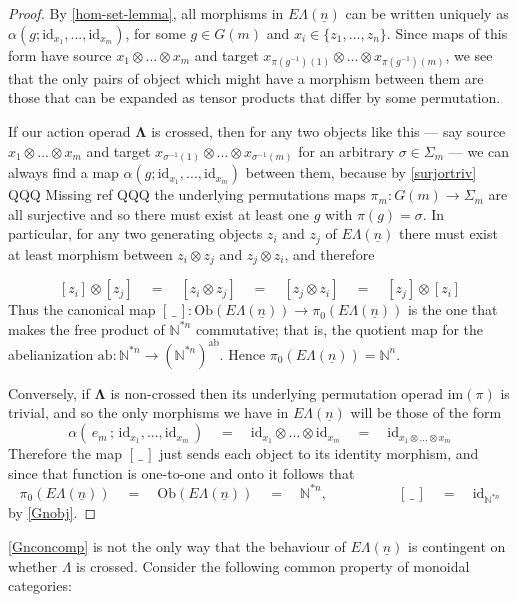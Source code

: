 \documentclass{amsbook} %
\newcommand{\ML}{\mathbf{\Lambda}}
\newcommand{\ELn}{E\Lambda(\underline{n})}
\numberwithin{section}{chapter}
\begin{document}
\begin{proof}
By \cref{hom-set-lemma}, all morphisms in $\ELn$ can be written uniquely as $\alpha(g; \mathrm{id}_{x_1}, ..., \mathrm{id}_{x_m})$, for some $g \in G(m)$ and $x_i \in \{z_1, ..., z_n \}$. Since maps of this form have source $x_1 \otimes ... \otimes x_m$ and target $x_{\pi(g^{-1})(1)} \otimes ... \otimes x_{\pi(g^{-1})(m)}$, we see that the only pairs of object which might have a morphism between them are those that can be expanded as tensor products that differ by some permutation. 


If our action operad $\ML$ is crossed, then for any two objects like this --- say source $x_1 \otimes ... \otimes x_m$ and target $x_{\sigma^{-1}(1)} \otimes ... \otimes x_{\sigma^{-1}(m)}$ for an arbitrary $\sigma \in \Sigma_m$ --- we can always find a map $\alpha(g; \mathrm{id}_{x_1}, ..., \mathrm{id}_{x_m})$ between them, because by \cref{surjortriv} QQQ Missing ref QQQ the underlying permutations maps $\pi_m: G(m) \to \Sigma_m$ are all surjective and so there must exist at least one $g$ with $\pi(g) = \sigma$. In particular, for any two generating objects $z_i$ and $z_j$ of $\ELn$ there must exist at least morphism between $z_i \otimes z_j$ and $z_j \otimes z_i$, and therefore

\[ [z_i] \otimes [z_j] \quad = \quad [z_i \otimes z_j] \quad = \quad [z_j \otimes z_i] \quad = \quad [z_j] \otimes [z_i] \]
Thus the canonical map $[ \, \_ \, ] : \mathrm{Ob}(\ELn) \to \pi_0(\ELn)$ is the one that makes the free product of $\mathbb{N}^{*n}$ commutative; that is, the quotient map for the abelianization $\mathrm{ab} : \mathbb{N}^{*n} \to (\mathbb{N}^{*n})^{\mathrm{ab}}$. Hence $\pi_0(\ELn) = \mathbb{N}^n$.

Conversely, if $\ML$ is non-crossed then its underlying permutation operad $\mathrm{im}(\pi)$ is trivial, and so the only morphisms we have in $\ELn$ will be those of the form
\[ \alpha( \, e_m \, ; \, \mathrm{id}_{x_1}, ..., \mathrm{id}_{x_m} \, ) \quad = \quad \mathrm{id}_{x_1} \otimes ... \otimes \mathrm{id}_{x_m} \quad = \quad \mathrm{id}_{x_1 \otimes ... \otimes x_m} \]
Therefore the map $[ \, \_ \,]$ just sends each object to its identity morphism, and since that function is one-to-one and onto it follows that
\[ \pi_0(\ELn) \quad = \quad \mathrm{Ob}(\ELn) \quad = \quad \mathbb{N}^{\ast n}, \quad \quad \quad \quad \quad [ \, \_ \,] \quad = \quad \mathrm{id}_{\mathbb{N}^{*n}} \]
by \cref{Gnobj}.
\end{proof}

\cref{Gnconcomp} is not the only way that the behaviour of $\ELn$ is contingent on whether $\Lambda$ is crossed. Consider the following common property of monoidal categories:
\end{document}
